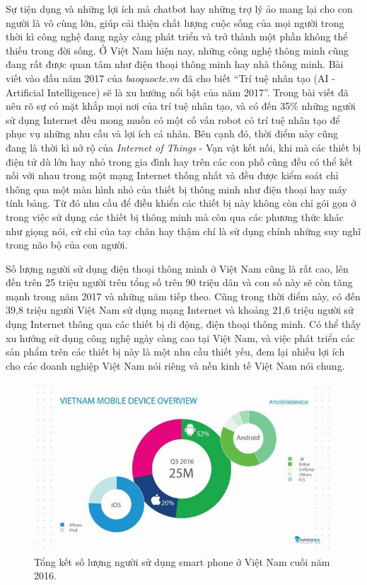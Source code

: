 \documentclass[12pt]{report}
\begin{document}
Sự tiện dụng và những lợi ích mà chatbot hay những trợ lý ảo mang lại cho con người là vô cùng lớn, giúp cải thiện chất lượng cuộc sống của mọi người trong thời kì công nghệ đang ngày càng phát triển và trở thành một phần không thể thiếu trong đời sống. Ở Việt Nam hiện nay, những công nghệ thông minh cũng đang rất được quan tâm như điện thoại thông minh hay nhà thông minh. Bài viết vào đầu năm 2017 của \textit{baoquocte.vn} đã cho biết ``Trí tuệ nhân tạo (AI - Artificial Intelligence) sẽ là xu hướng nổi bật của năm 2017''\cite{tech-trending}. Trong bài viết đã nêu rõ sự có mặt khắp mọi nơi của trí tuệ nhân tạo, và có đến 35\% những người sử dụng Internet đều mong muốn có một cố vấn robot có trí tuệ nhân tạo để phục vụ những nhu cầu và lợi ích cá nhân. Bên cạnh đó, thời điểm này cũng đang là thời kì nở rộ của \textit{Internet of Things} - Vạn vật kết nối, khi mà các thiết bị điện tử dù lớn hay nhỏ trong gia đình hay trên các con phố cũng đều có thể kết nối với nhau trong một mạng Internet thống nhất và đều được kiểm soát chỉ thông qua một màn hình nhỏ của thiết bị thông minh như điện thoại hay máy tính bảng. Từ đó nhu cầu để điều khiển các thiết bị này không còn chỉ gói gọn ở trong việc sử dụng các thiết bị thông minh mà còn qua các phương thức khác như giọng nói, cử chỉ của tay chân hay thậm chí là sử dụng chính những suy nghĩ trong não bộ của con người.

Số lượng người sử dụng điện thoại thông minh ở Việt Nam cũng là rất cao, lên đến trên 25 triệu người trên tổng số trên 90 triệu dân và con số này sẽ còn tăng mạnh trong năm 2017 và những năm tiếp theo\cite{tech-report}. Cũng trong thời điểm này, có đến 39,8 triệu người Việt Nam sử dụng mạng Internet và khoảng 21,6 triệu người sử dụng Internet thông qua các thiết bị di động, điện thoại thông minh. Có thể thấy xu hướng sử dụng công nghệ ngày càng cao tại Việt Nam, và việc phát triển các sản phẩm trên các thiết bị này là một nhu cầu thiết yếu, đem lại nhiều lợi ích cho các doanh nghiệp Việt Nam nói riêng và nền kinh tế Việt Nam nói chung.

\begin{figure}[H]
  \centering
    \includegraphics[width=15cm]{Pics/Chap1/mobile-vietnam.jpg}
  \caption{Tổng kết số lượng người sử dụng smart phone ở Việt Nam cuối năm 2016\cite{tech-report}.}
\end{figure}
\end{document}
